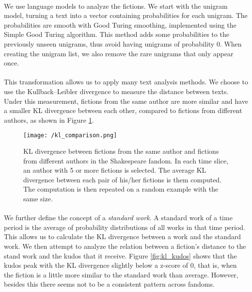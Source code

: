 \documentclass[11pt]{article} %
\begin{document}
\paragraph{} We use language models to analyze the fictions. We start with the unigram model, turning a text into a vector containing probabilities for each unigram. The probabilities are smooth with Good Turing smoothing, implemented using the Simple Good Turing algorithm\cite{gales1995good}. This method adds some probabilities to the previously unseen unigrams, thus avoid having unigrams of probability 0. When creating the unigram list, we also remove the rare unigrams that only appear once.

\paragraph{} This transformation allows us to apply many text analysis methods. We choose to use the Kullback--Leibler divergence to measure the distance between texts. Under this measurement, fictions from the same author are more similar and have a smaller KL divergence between each other, compared to fictions from different authors, as shown in Figure \ref{fig:kl_comp}.


\begin{figure}[htbp]
\begin{center}
\texttt{[image: /kl\_comparison.png]}
\caption{KL divergence between fictions from the same author and fictions from different authors in the Shakespeare fandom. In each time slice, an author with 5 or more fictions is selected. The average KL divergence between each pair of his/her fictions is them computed. The computation is then repeated on a random example with the same size. }
\label{fig:kl_comp}
\end{center}
\end{figure}

\paragraph{} We further define the concept of a \emph{standard work}. A standard work of a time period is the average of probability distributions of all works in that time period. This allows us to calculate the KL divergence between a work and the standard work. We then attempt to analyze the relation between a fiction's distance to the stand work and the kudos that it receive. Figure \ref{fig:kl_kudos} shows that the kudos peak with the KL divergence slightly below a z-score of 0, that is, when the fiction is a little more similar to the standard work than average. However, besides this there seems not to be a consistent pattern across fandoms.
\end{document}
